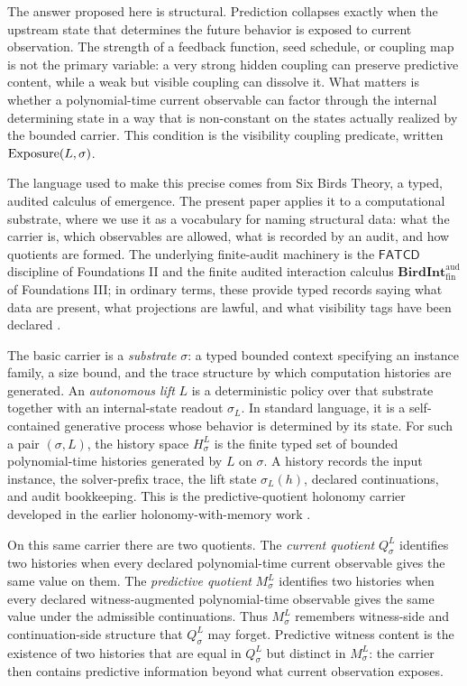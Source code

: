 \documentclass[11pt]{article}
\newcommand{\Substrate}{\sigma}             \newcommand{\Lift}{L}                       \newcommand{\LiftState}{\sigma_{L}}         \newcommand{\HistorySpace}{H_{\Substrate}^{\Lift}}
\newcommand{\Qquotient}{Q_{\Substrate}^{\Lift}}
\newcommand{\Mquotient}{M_{\Substrate}^{\Lift}}
\newcommand{\FATCD}{\mathsf{FATCD}}
\newcommand{\BirdInt}{\mathbf{BirdInt}^{\mathrm{aud}}_{\mathrm{fin}}}
\theoremstyle{definition}
\begin{document}
The answer proposed here is structural.  Prediction
collapses exactly when the upstream state that determines the future
behavior is exposed to current observation.  The strength of a feedback
function, seed schedule, or coupling map is not the primary variable:
a very strong hidden coupling can preserve predictive content, while a
weak but visible coupling can dissolve it.  What matters is whether a
polynomial-time current observable can factor through the internal
determining state in a way that is non-constant on the states actually
realized by the bounded carrier.  This condition is the visibility
coupling predicate, written \(\Exposure(\Lift,\Substrate)\).

The language used to make this precise comes from Six Birds Theory, a
typed, audited calculus of emergence.  The present paper applies it to
a computational substrate, where we use it as a vocabulary for naming
structural data: what the carrier is, which observables are allowed,
what is recorded by an audit, and how quotients are formed.  The underlying finite-audit machinery is the
\(\FATCD\) discipline of Foundations II and the finite audited
interaction calculus \(\BirdInt\) of Foundations III; in ordinary terms,
these provide typed records saying what data are present, what
projections are lawful, and what visibility tags have been declared
\citep{TsiokosFoundationsII2026,TsiokosFoundationsIII2026}.

The basic carrier is a \emph{substrate} \(\Substrate\): a typed bounded
context specifying an instance family, a size bound, and the trace
structure by which computation histories are generated.  An
\emph{autonomous lift} \(\Lift\) is a deterministic policy over that
substrate together with an internal-state readout
\(\LiftState\).  In standard language, it is a self-contained
generative process whose behavior is determined by its state.  For
such a pair \((\Substrate,\Lift)\), the history space
\(\HistorySpace\) is the finite typed set of bounded polynomial-time
histories generated by \(\Lift\) on \(\Substrate\).  A history records
the input instance, the solver-prefix trace, the lift state
\(\LiftState(h)\), declared continuations, and audit bookkeeping.
This is the predictive-quotient holonomy carrier developed in the
earlier holonomy-with-memory work \citep{TsiokosHolonomyMemory2026}.

On this same carrier there are two quotients.  The \emph{current
quotient} \(\Qquotient\) identifies two histories when every declared
polynomial-time current observable gives the same value on them.  The
\emph{predictive quotient} \(\Mquotient\) identifies two histories
when every declared witness-augmented polynomial-time observable gives
the same value under the admissible continuations.  Thus
\(\Mquotient\) remembers witness-side and continuation-side structure
that \(\Qquotient\) may forget.  Predictive witness content is the
existence of two histories that are equal in \(\Qquotient\) but
distinct in \(\Mquotient\): the carrier then contains predictive
information beyond what current observation exposes.
\end{document}
